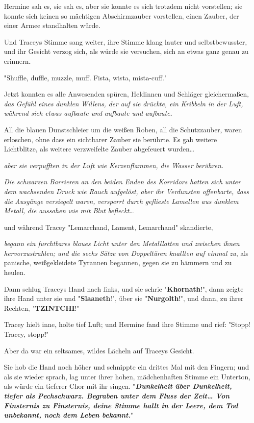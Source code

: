 {Hermine sah es, sie sah es, aber sie konnte es sich trotzdem nicht vorstellen; sie konnte sich keinen so mächtigen Abschirmzauber vorstellen, einen Zauber, der einer Armee standhalten würde.

Und Traceys Stimme sang weiter, ihre Stimme klang lauter und selbstbewusster, und ihr Gesicht verzog sich, als würde sie versuchen, sich an etwas ganz genau zu erinnern.

"Shuffle, duffle, muzzle, muff. Fista, wista, mista-cuff."

Jetzt konnten es alle Anwesenden spüren, Heldinnen und Schläger gleichermaßen, \emph{das Gefühl eines dunklen Willens, der auf sie drückte, ein Kribbeln in der Luft, während sich etwas aufbaute und aufbaute und aufbaute.}

All die blauen Dunstschleier um die weißen Roben, all die Schutzzauber, waren erloschen, ohne dass ein sichtbarer Zauber sie berührte. Es gab weitere Lichtblitze, als weitere verzweifelte Zauber abgefeuert wurden…

\emph{aber sie verpufften in der Luft wie Kerzenflammen, die Wasser berühren.}

\emph{Die schwarzen Barrieren an den beiden Enden des Korridors hatten sich unter dem wachsenden Druck wie Rauch aufgelöst, aber ihr Verdunsten offenbarte, dass die} \emph{Ausgänge versiegelt waren, versperrt durch geflieste Lamellen aus dunklem Metall, die aussahen wie mit Blut befleckt…}

und während Tracey "Lemarchand, Lament, Lemarchand" skandierte,

\emph{begann ein furchtbares blaues Licht unter den Metalllatten und zwischen ihnen hervorzustrahlen; und die sechs Sätze von Doppeltüren knallten auf einmal zu}, als panische, weißgekleidete Tyrannen begannen, gegen sie zu hämmern und zu heulen.

Dann schlug Traceys Hand nach links, und sie schrie "\textbf{Khornath}!", dann zeigte ihre Hand unter sie und "\textbf{Slaaneth}!", über sie "\textbf{Nurgolth}!", und dann, zu ihrer Rechten, "\textbf{TZINTCHI}!"

Tracey hielt inne, holte tief Luft; und Hermine fand ihre Stimme und rief: "Stopp! Tracey, stopp!"

Aber da war ein seltsames, wildes Lächeln auf Traceys Gesicht.

Sie hob die Hand noch höher und schnippte ein drittes Mal mit den Fingern; und als sie wieder sprach, lag unter ihrer hohen, mädchenhaften Stimme ein Unterton, als würde ein tieferer Chor mit ihr singen. "\textbf{\emph{Dunkelheit über Dunkelheit, tiefer als Pechschwarz. Begraben unter dem Fluss der Zeit… Von Finsternis zu Finsternis, deine Stimme hallt in der Leere, dem Tod unbekannt, noch dem Leben bekannt.}}"

}

